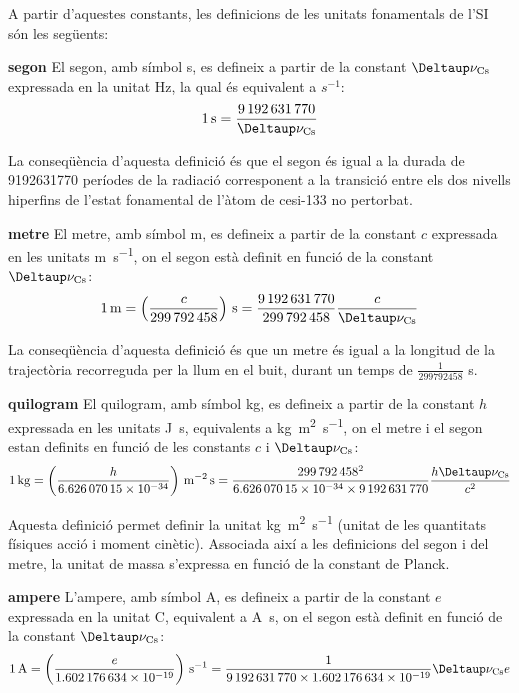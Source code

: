 A partir d'aquestes constants, les definicions de les unitats fonamentals de l'SI són les següents:
\begin{list}{}
   {\setlength{\labelwidth}{22mm} \setlength{\leftmargin}{22mm} \setlength{\labelsep}{2mm}}
   \item[\textbf{segon}] El segon, amb símbol s, es defineix a partir de la constant $\Deltaup\nu\ped{Cs}$ expressada en la unitat Hz, la qual és equivalent a $\unit{s^{-1}}$:
       \[
            \qty{1}{s} = \frac{\num{9192631770}}{\Deltaup\nu\ped{Cs}}
       \]

    La conseqüència d'aquesta definició és que el segon és igual a la durada de \num{9192631770} períodes de la
   radiació corresponent a la transició entre els dos nivells
  hiperfins de l'estat fonamental de l'àtom de cesi-133 no pertorbat.

   \item[\textbf{metre}]  El metre, amb símbol m, es defineix a partir de la constant $c$ expressada en les unitats \unit{m.s^{-1}}, on el segon està definit en funció de la constant  $\Deltaup\nu\ped{Cs}$:
       \[
            \qty{1}{m} = \left(\frac{c}{\num{299792458}}\right)\unit{\,s} = \frac{\num{9192631770}}{\num{299792458}}\frac{c}{\Deltaup\nu\ped{Cs}}
       \]

    La conseqüència d'aquesta definició és que un metre és igual a la longitud de la trajectòria recorreguda per la llum
   en el buit, durant un temps de $\frac{1}{\num{299792458}}$ s.

   \item[\textbf{quilogram}] El quilogram, amb símbol kg, es defineix a partir de la constant $h$ expressada en les unitats \unit{J.s}, equivalents a \unit{kg.m^2.s^{-1}}, on el metre i el segon estan definits en funció de les constants $c$ i $\Deltaup\nu\ped{Cs}$:
       \[
            \qty{1}{kg} = \left(\frac{h}{\num{6,62607015 e-34}}\right)\unit{\,m^{-2}.s} = \frac{\num{299792458}^2}{\num{6,62607015 e-34}\times\num{9192631770}}\frac{h\Deltaup\nu\ped{Cs}}{c^2}
       \]

   Aquesta definició permet definir la unitat \unit{kg.m^2.s^{-1}} (unitat de les quantitats físiques acció i moment cinètic). Associada així a les definicions del segon i del metre,  la unitat de massa s'expressa en funció  de la constant de Planck.


   \item[\textbf{ampere}] L'ampere, amb símbol A, es defineix a partir de la constant $e$ expressada en la unitat C,  equivalent a \unit{A.s}, on el segon està definit en funció de la constant  $\Deltaup\nu\ped{Cs}$:
       \[
            \qty{1}{A} = \left(\frac{e}{\num{1,602176634 e-19}}\right)\unit{\,s^{-1}} = \frac{1}{\num{9192631770}\times\num{1,602176634 e-19}} \Deltaup\nu\ped{Cs} e
       \]


\end{list}
